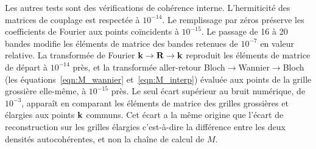 Les autres tests sont des vérifications de cohérence interne. L'hermiticité des matrices de couplage est respectée à $10^{-14}$. Le remplissage par zéros préserve les coefficients de Fourier aux points coïncidents à $10^{-15}$. Le passage de 16 à 20 bandes modifie les éléments de matrice des bandes retenues de $10^{-7}$ en valeur relative. La transformée de Fourier $\mathbf{k}\to\mathbf{R}\to\mathbf{k}$ reproduit les éléments de matrice de départ à $10^{-14}$ près, et la transformée aller-retour Bloch$\to$Wannier$\to$Bloch (les équations~\eqref{eqn:M_wannier} et~\eqref{eqn:M_interp}) évaluée aux points de la grille grossière elle-même, à $10^{-15}$ près. Le seul écart supérieur au bruit numérique, de $10^{-3}$, apparaît en comparant les éléments de matrice des grilles grossières et élargies aux points $\mathbf{k}$ communs. Cet écart a la même origine que l'écart de reconstruction sur les grilles élargies c'est-à-dire la différence entre les deux densités autocohérentes, et non la chaîne de calcul de $M$.
